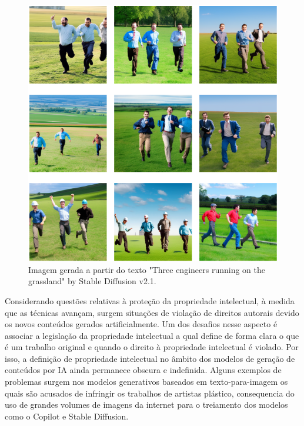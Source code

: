 \begin{figure}
  \centering 
  \includegraphics[scale=0.47]{images_generated_with_text_three_engineers.png}
  \caption{Imagem gerada a partir do texto "Three engineers running on the grassland" by Stable Diffusion v2.1.}
  \label{fig:images_of_three_engineers}
\end{figure}



Considerando questões relativas à proteção da propriedade intelectual, 
à medida que as técnicas avançam, surgem situações de violação de direitos autorais
devido os novos conteúdos gerados artificialmente. Um dos desafios nesse aspecto 
é associar a legislação da propriedade intelectual a qual define de forma clara o que é um trabalho original 
e quando o direito à propriedade intelectual é violado. Por isso, a definição de propriedade intelectual no âmbito 
dos modelos de geração de conteúdos por IA ainda permanece obscura e indefinida.
Alguns exemplos de problemas surgem nos modelos generativos 
baseados em texto-para-imagem os quais são acusados de infringir os trabalhos de artistas plástico, 
consequencia do uso de grandes volumes de imagens da internet para o treiamento dos modelos como o Copilot e Stable Diffusion.

